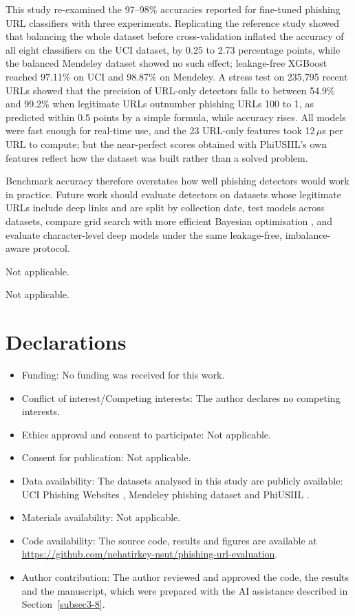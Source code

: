 \documentclass[pdflatex,sn-mathphys-num]{sn-jnl}%
\theoremstyle{thmstyleone}%
\theoremstyle{thmstyletwo}%
\theoremstyle{thmstylethree}%
\begin{document}
This study re-examined the 97--98\% accuracies reported for fine-tuned phishing URL classifiers with three experiments. Replicating the reference study showed that balancing the whole dataset before cross-validation inflated the accuracy of all eight classifiers on the UCI dataset, by 0.25 to 2.73 percentage points, while the balanced Mendeley dataset showed no such effect; leakage-free XGBoost reached 97.11\% on UCI and 98.87\% on Mendeley. A stress test on 235,795 recent URLs showed that the precision of URL-only detectors falls to between 54.9\% and 99.2\% when legitimate URLs outnumber phishing URLs 100 to 1, as predicted within 0.5 points by a simple formula, while accuracy rises. All models were fast enough for real-time use, and the 23 URL-only features took 12\,$\mu$s per URL to compute; but the near-perfect scores obtained with PhiUSIIL's own features reflect how the dataset was built rather than a solved problem.

Benchmark accuracy therefore overstates how well phishing detectors would work in practice. Future work should evaluate detectors on datasets whose legitimate URLs include deep links and are split by collection date, test models across datasets, compare grid search with more efficient Bayesian optimisation \cite{akiba2019}, and evaluate character-level deep models \cite{le2018} under the same leakage-free, imbalance-aware protocol.

\backmatter


Not applicable.


Not applicable.

\section*{Declarations}

\begin{itemize}
\item Funding: No funding was received for this work.
\item Conflict of interest/Competing interests: The author declares no competing interests.
\item Ethics approval and consent to participate: Not applicable.
\item Consent for publication: Not applicable.
\item Data availability: The datasets analysed in this study are publicly available: UCI Phishing Websites \cite{mohammad2012uci}, Mendeley phishing dataset \cite{tan2018} and PhiUSIIL \cite{prasad2024data}.
\item Materials availability: Not applicable.
\item Code availability: The source code, results and figures are available at \url{https://github.com/nehatirkey-nsut/phishing-url-evaluation}.
\item Author contribution: The author reviewed and approved the code, the results and the manuscript, which were prepared with the AI assistance described in Section~\ref{subsec3-8}.
\end{itemize}


\end{document}
